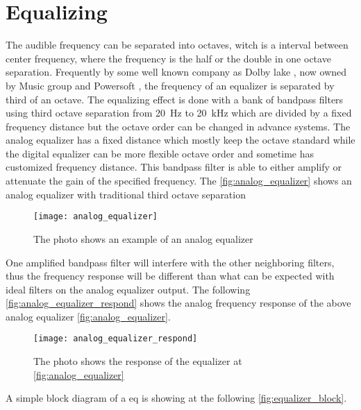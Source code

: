 \section{Equalizing}
The audible frequency can be separated into octaves, witch is a interval between center frequency, where the frequency is the half or the double in one octave separation. Frequently by some well known company as Dolby lake \citep{lab_gruppen_eq}, now owned by Music group and Powersoft \citep{powersoft_eq}, the frequency of an equalizer is separated by third of an octave. 
The equalizing effect is done with a bank of bandpass filters using third octave separation from \SI{20}{\hertz} to \SI{20}{\kilo\hertz} which are divided by a fixed frequency distance but the octave order can be changed in advance systems. The analog equalizer has a fixed distance which mostly keep the octave standard while the digital equalizer can be more flexible octave order and sometime has customized frequency distance. This bandpass filter is able to either amplify or attenuate the gain of the specified frequency. The \autoref{fig:analog_equalizer} shows an analog equalizer with traditional third octave separation \citep{nordic}

\begin{figure} [htbp]
 \centering
  \texttt{[image: analog\_equalizer]}
  \caption{The photo shows an example of an analog equalizer}
  \label{fig:analog_equalizer}
\end{figure}

One amplified bandpass filter will interfere with the other neighboring filters, thus the frequency response will be different than what can be expected with ideal filters on the analog equalizer output. The following \autoref{fig:analog_equalizer_respond} shows the analog frequency response of the above analog equalizer \autoref{fig:analog_equalizer}.

\begin{figure} [htbp]
 \centering
  \texttt{[image: analog\_equalizer\_respond]}
  \caption{The photo shows the response of the equalizer at \autoref{fig:analog_equalizer} }
  \label{fig:analog_equalizer_respond}
\end{figure}

A simple block diagram of a \gls{eq}  is showing at the following \autoref{fig:equalizer_block}.

